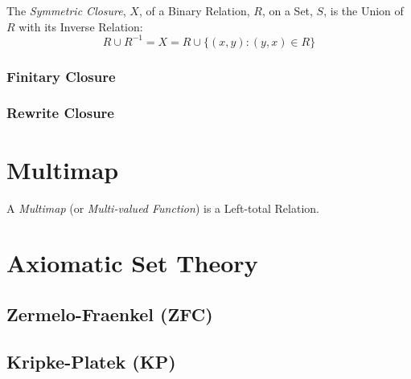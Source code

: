 The \emph{Symmetric Closure}, $X$, of a Binary Relation, $R$, on a
Set, $S$, is the Union of $R$ with its Inverse Relation:
\[
    R \cup R^{-1} = X = R \cup \{(x,y) : (y,x) \in R\}
\]



\subsubsection{Finitary Closure}\label{sec:finitary_closure}



\subsubsection{Rewrite Closure}\label{sec:rewrite_closure}



\section{Multimap}\label{sec:multimap}

A \emph{Multimap} (or \emph{Multi-valued Function}) is a Left-total
Relation.



\section{Axiomatic Set Theory}\label{sec:axiomatic_set_theory}

\subsection{Zermelo-Fraenkel (ZFC)}\label{sec:zermelo_fraenkel}

\subsection{Kripke-Platek (KP)}\label{sec:kripke_platek}

